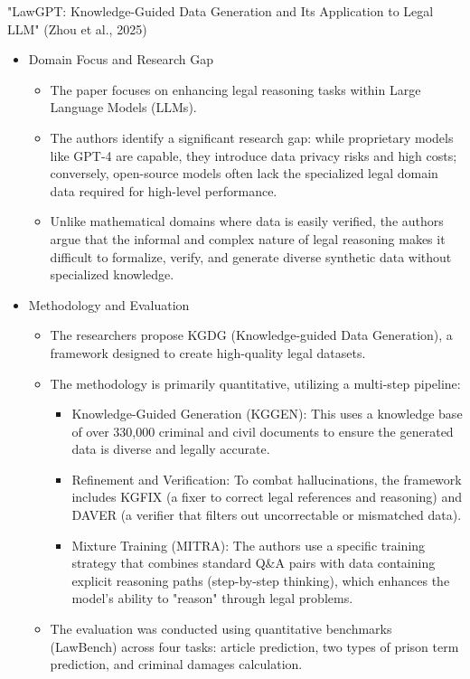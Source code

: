 
"LawGPT: Knowledge-Guided Data Generation and Its Application to Legal LLM" (Zhou et al., 2025) \cite{zhouLawGPTKnowledgeGuidedData2025} 

\begin{itemize}
  \item Domain Focus and Research Gap
  \begin{itemize}
    \item The paper focuses on enhancing legal reasoning tasks within Large Language Models (LLMs).
    \item The authors identify a significant research gap: while proprietary models like GPT-4 are capable, they introduce data privacy risks and high costs; conversely, open-source models often lack the specialized legal domain data required for high-level performance.
    \item Unlike mathematical domains where data is easily verified, the authors argue that the informal and complex nature of legal reasoning makes it difficult to formalize, verify, and generate diverse synthetic data without specialized knowledge.
  \end{itemize}

  \item Methodology and Evaluation
  \begin{itemize}
    \item The researchers propose KGDG (Knowledge-guided Data Generation), a framework designed to create high-quality legal datasets.
    \item The methodology is primarily quantitative, utilizing a multi-step pipeline:
    \begin{itemize}
      \item Knowledge-Guided Generation (KGGEN): This uses a knowledge base of over 330,000 criminal and civil documents to ensure the generated data is diverse and legally accurate.
      \item Refinement and Verification: To combat hallucinations, the framework includes KGFIX (a fixer to correct legal references and reasoning) and DAVER (a verifier that filters out uncorrectable or mismatched data).
      \item Mixture Training (MITRA): The authors use a specific training strategy that combines standard Q\&A pairs with data containing explicit reasoning paths (step-by-step thinking), which enhances the model’s ability to "reason" through legal problems.
    \end{itemize}
    \item The evaluation was conducted using quantitative benchmarks (LawBench) across four tasks: article prediction, two types of prison term prediction, and criminal damages calculation.
  \end{itemize}


\end{itemize}
